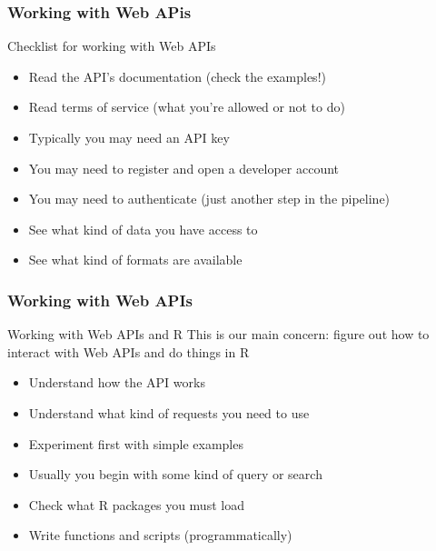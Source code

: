 \documentclass{beamer}\usepackage[]{graphicx}\usepackage[]{color}
\begin{document}

\begin{frame}
\frametitle{Working with Web APis}

\begin{block}{Checklist for working with Web APIs}
\begin{itemize}
 \item Read the API's documentation (check the examples!)
 \item Read terms of service (what you're allowed or not to do)
 \item Typically you may need an API key
 \item You may need to register and open a developer account
 \item You may need to authenticate (just another step in the pipeline)
 \item See what kind of data you have access to
 \item See what kind of formats are available
\end{itemize}
\end{block}

\end{frame}


\begin{frame}
\frametitle{Working with Web APIs}

\begin{block}{Working with Web APIs and R}
This is our main concern: figure out how to interact with Web APIs and do things in R
\begin{itemize}
 \item Understand how the API works \\
 \item Understand what kind of requests you need to use \\
 \item Experiment first with simple examples
 \item Usually you begin with some kind of query or search
 \item Check what R packages you must load \\
 \item Write functions and scripts (programmatically)
\end{itemize}
\end{block}

\end{frame}
\end{document}
